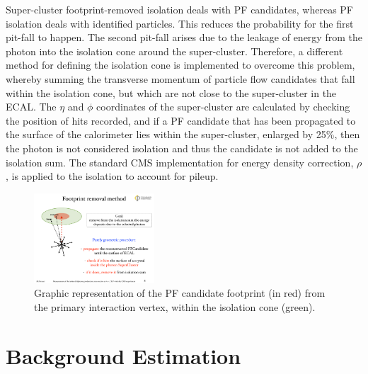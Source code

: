 Super-cluster footprint-removed isolation deals with PF candidates, whereas PF isolation deals with identified particles. This reduces the probability for the first pit-fall to happen. The second pit-fall arises due to the leakage of energy from the photon into the isolation cone around the super-cluster. Therefore, a different method for defining the isolation cone is implemented to overcome this problem, whereby summing the transverse momentum of particle flow candidates that fall within the isolation cone, but which are not close to the super-cluster in the ECAL. The $\eta$ and $\phi$ coordinates of the super-cluster are calculated by checking the position of hits recorded, and if a PF candidate that has been propagated to the surface of the calorimeter lies within the super-cluster, enlarged by 25\%, then the photon is not considered isolation and thus the candidate is not added to the isolation sum. The standard CMS implementation for energy density correction, $\rho$, is applied to the isolation to account for pileup. 

\begin{figure} \label{fig-SCFR}
\begin{center}
\includegraphics[width=0.4\textwidth]{Figures/RandomCone3.pdf}
\caption{Graphic representation of the PF candidate footprint (in red) from the primary interaction vertex, within the isolation cone (green). \cite{MarcoThesis}}
\end{center}
\end{figure}

\section{Background Estimation}

